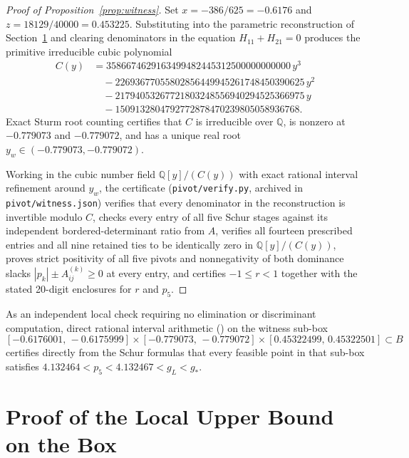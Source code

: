 \documentclass[11pt]{article}
\theoremstyle{remark}
\begin{document}
\begin{proof}[Proof of Proposition~\ref{prop:witness}]
Set $x=-386/625=-0.6176$ and $z=18129/40000=0.453225$. Substituting into the
parametric reconstruction of Section~\ref{sec:box-proof} and clearing
denominators in the equation $H_{11}+H_{21}=0$ produces the primitive
irreducible cubic polynomial
\begin{equation}\label{eq:witness-cubic}
\begin{aligned}
  C(y) &= 3586674629163499482445312500000000000\,y^3 \\
       &\quad - 22693677055802856449945261748450390625\,y^2 \\
       &\quad - 21794053267721803248556940294525366975\,y \\
       &\quad - 1509132804792772878470239805058936768.
\end{aligned}
\end{equation}
Exact Sturm root counting certifies that $C$ is irreducible over $\mathbb{Q}$,
is nonzero at $-0.779073$ and $-0.779072$, and has a unique real root
$y_w \in (-0.779073,-0.779072)$.

Working in the cubic number field $\mathbb{Q}[y]/(C(y))$ with exact rational
interval refinement around $y_w$, the certificate (\texttt{pivot/verify.py},
archived in \texttt{pivot/witness.json}) verifies that every denominator in
the reconstruction is invertible modulo $C$, checks every entry of all five
Schur stages against its independent bordered-determinant ratio from $A$,
verifies all fourteen prescribed entries and all nine retained ties to be
identically zero in $\mathbb{Q}[y]/(C(y))$, proves strict positivity of all
five pivots and nonnegativity of both dominance slacks
$|p_k|\pm A^{(k)}_{ij}\ge 0$ at every entry, and certifies $-1\le r<1$
together with the stated 20-digit enclosures for $r$ and $p_5$.
\end{proof}

As an independent local check requiring no elimination or discriminant
computation, direct rational interval arithmetic
() on the witness sub-box
\[
  [-0.6176001,\,-0.6175999]
  \times [-0.779073,\,-0.779072]
  \times [0.45322499,\,0.45322501]
  \subset B
\]
certifies directly from the Schur formulas that every feasible point in that
sub-box satisfies $4.132464 < p_5 < 4.132467 < g_L < g_*$.

\section{Proof of the Local Upper Bound on the Box}\label{sec:box-proof}
\end{document}
